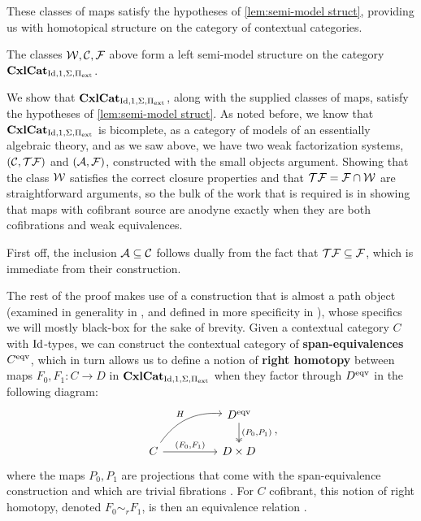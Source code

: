\documentclass{amsart}
\begin{document}
These classes of maps satisfy the hypotheses of \ref{lem:semi-model struct}, providing us with homotopical structure on the category of contextual categories.

\begin{thm}\cite[Thm. 6.9]{KL18}
    The classes $\mathcal{W},\mathcal{C},\mathcal{F}$ above form a left semi-model structure on the category $\operatorname{\mathbf{CxlCat}}_{\operatorname{Id},1,\Sigma,\Pi_{\operatorname{ext}}}$.
\end{thm}
\begin{sketch}
    We show that $\operatorname{\mathbf{CxlCat}}_{\operatorname{Id},1,\Sigma,\Pi_{\operatorname{ext}}}$, along with the supplied classes of maps, satisfy the hypotheses of \ref{lem:semi-model struct}. As noted before, we know that $\operatorname{\mathbf{CxlCat}}_{\operatorname{Id},1,\Sigma,\Pi_{\operatorname{ext}}}$ is bicomplete, as a category of models of an essentially algebraic theory, and as we saw above, we have two weak factorization systems, $(\mathcal{C},\mathcal{T}\mathcal{F})$ and $(\mathcal{A},\mathcal{F})$, constructed with the small objects argument. Showing that the class $\mathcal{W}$ satisfies the correct closure properties and that $\mathcal{T}\mathcal{F}=\mathcal{F}\cap\mathcal{W}$ are straightforward arguments, so the bulk of the work that is required is in showing that maps with cofibrant source are anodyne exactly when they are both cofibrations and weak equivalences.

    First off, the inclusion $\mathcal{A}\subseteq\mathcal{C}$ follows dually from the fact that $\mathcal{T}\mathcal{F}\subseteq\mathcal{F}$, which is immediate from their construction.

    The rest of the proof makes use of a construction that is almost a path object (examined in generality in \cite{KL21b}, and defined in more specificity in \cite[Def. 5.5]{KL18}), whose specifics we will mostly black-box for the sake of brevity. Given a contextual category $C$ with $\operatorname{Id}$-types, we can construct the contextual category of \textbf{span-equivalences} $C^{\operatorname{eqv}}$, which in turn allows us to define a notion of \textbf{right homotopy} between maps $F_0,F_1\colon C\to D$ in $\operatorname{\mathbf{CxlCat}}_{\operatorname{Id},1,\Sigma,\Pi_{\operatorname{ext}}}$ when they factor through $D^{\operatorname{eqv}}$ in the following diagram:
    \[\begin{tikzcd}
            &  & D^{\text{eqv}} \arrow[d, "{(P_0,P_1)}", two heads] \\
        C \arrow[rr, "{(F_0,F_1)}"] \arrow[rru, "H", bend left] &  & D\times D                                         
    \end{tikzcd},\]
    where the maps $P_0,P_1$ are projections that come with the span-equivalence construction and which are trivial fibrations \cite[Prop. 4.13.3, Prop. 5.12]{KL18}. For $C$ cofibrant, this notion of right homotopy, denoted $F_0\sim_r F_1$, is then an equivalence relation \cite[Prop. 6.3]{KL18}.


\end{sketch}
\end{document}
